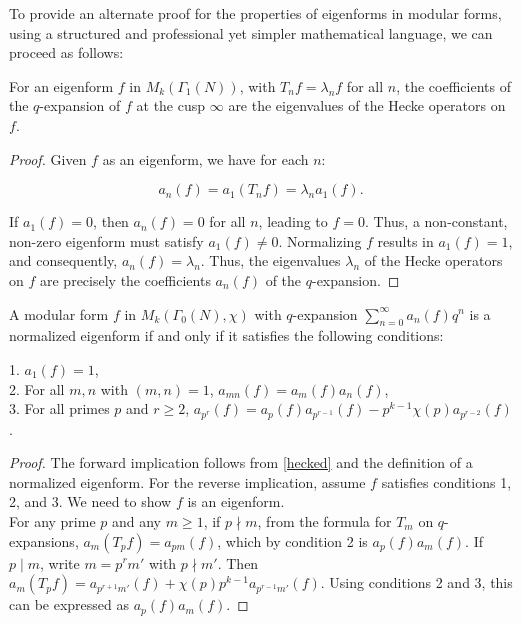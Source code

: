 To provide an alternate proof for the properties of eigenforms in modular forms, using a structured and professional yet simpler mathematical language, we can proceed as follows:

 \begin{theorem}\label{hecked}
 For an eigenform \( f \) in \( M_{k}(\Gamma_{1}(N)) \), with \( T_{n} f = \lambda_{n} f \) for all \( n \), the coefficients of the \( q \)-expansion of \( f \) at the cusp \( \infty \) are the eigenvalues of the Hecke operators on \( f \).     
 \end{theorem}
\begin{proof}
Given \( f \) as an eigenform, we have for each \( n \):

\[
a_{n}(f) = a_{1}(T_{n} f) = \lambda_{n} a_{1}(f).
\]

If \( a_{1}(f) = 0 \), then \( a_{n}(f) = 0 \) for all \( n \), leading to \( f = 0 \). Thus, a non-constant, non-zero eigenform must satisfy \( a_{1}(f) \neq 0 \). Normalizing \( f \) results in \( a_{1}(f) = 1 \), and consequently, \( a_{n}(f) = \lambda_{n} \). Thus, the eigenvalues \( \lambda_{n} \) of the Hecke operators on \( f \) are precisely the coefficients \( a_{n}(f) \) of the \( q \)-expansion.    
\end{proof}

\begin{proposition}
    A modular form \( f \) in \( M_{k}(\Gamma_{0}(N), \chi) \) with \( q \)-expansion \( \sum_{n=0}^{\infty} a_{n}(f) q^{n} \) is a normalized eigenform if and only if it satisfies the following conditions:

1. \( a_{1}(f) = 1 \),\\
2. For all \( m, n \) with \( (m, n) = 1 \), \( a_{mn}(f) = a_{m}(f) a_{n}(f) \),\\
3. For all primes \( p \) and \( r \geq 2 \), \( a_{p^{r}}(f) = a_{p}(f) a_{p^{r-1}}(f) - p^{k-1} \chi(p) a_{p^{r-2}}(f) \).

\end{proposition} 

\begin{proof}
The forward implication follows from \ref{hecked} and the definition of a normalized eigenform. For the reverse implication, assume \( f \) satisfies conditions 1, 2, and 3. We need to show \( f \) is an eigenform. \\
For any prime \( p \) and any \( m \geq 1 \), if \( p \nmid m \), from the formula for \( T_{m} \) on \( q \)-expansions, \( a_{m}(T_{p} f) = a_{pm}(f) \), which by condition 2 is \( a_{p}(f) a_{m}(f) \).
If \( p \mid m \), write \( m = p^{r}m' \) with \( p \nmid m' \). Then \( a_{m}(T_{p} f) = a_{p^{r+1} m'}(f) + \chi(p)p^{k-1}a_{p^{r-1} m'}(f) \). Using conditions 2 and 3, this can be expressed as \( a_{p}(f) a_{m}(f) \).
\end{proof}



